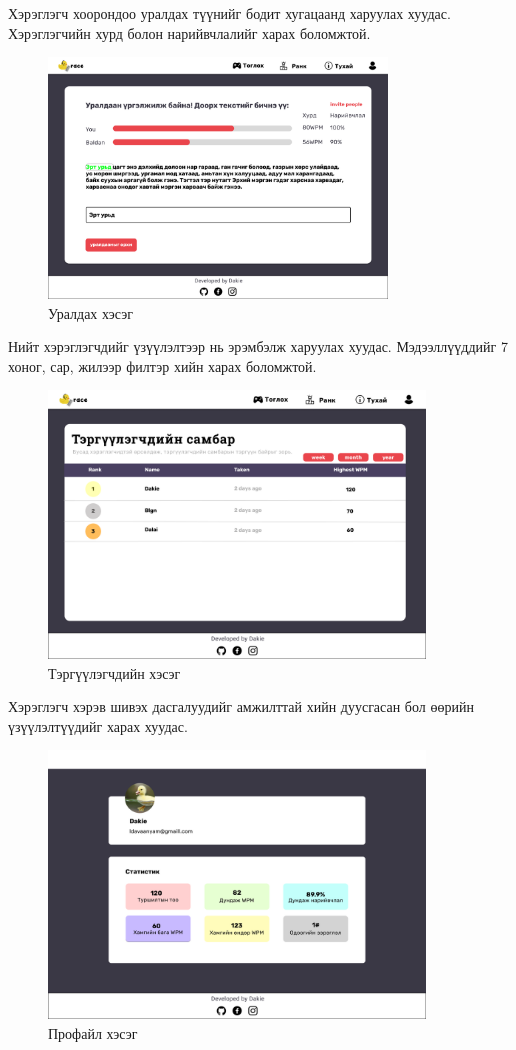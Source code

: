 Хэрэглэгч хоорондоо уралдах түүнийг бодит хугацаанд харуулах хуудас. Хэрэглэгчийн хурд болон нарийвчлалийг харах боломжтой.  
\begin{figure}[h]
	\centering
	\includegraphics[width=9cm]{images/interfaces/ver1/playpage.png}
	\caption{Уралдах хэсэг}
	\label{fig:interface-v1-02}
\end{figure}

\pagebreak
Нийт хэрэглэгчдийг үзүүлэлтээр нь эрэмбэлж харуулах хуудас. Мэдээллүүддийг 7 хоног, сар, жилээр филтэр хийн харах боломжтой.
\begin{figure}[h]
	\centering
	\includegraphics[width=10cm]{images/interfaces/ver1/leaderboard.png}
	\caption{Тэргүүлэгчдийн хэсэг}
	\label{fig:interface-v1-03}
\end{figure}

Хэрэглэгч хэрэв шивэх дасгалуудийг амжилттай хийн дуусгасан бол өөрийн үзүүлэлтүүдийг харах хуудас.
\begin{figure}[h]
	\centering
	\includegraphics[width=10cm]{images/interfaces/ver1/profilepage.png}
	\caption{Профайл хэсэг}
	\label{fig:interface-v1-04}
\end{figure}

